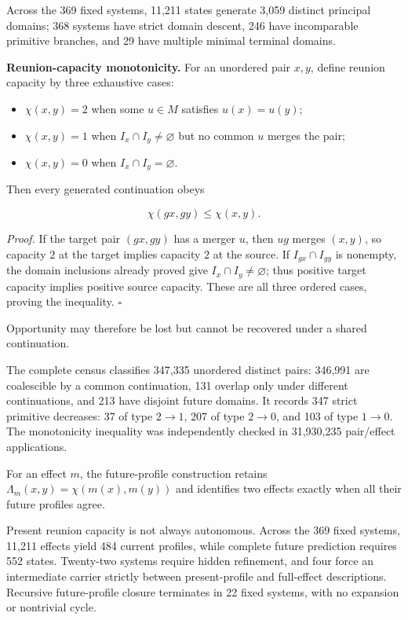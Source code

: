 \documentclass[11pt,a4paper]{article}
\begin{document}
Across the 369 fixed systems, 11,211 states generate 3,059 distinct
principal domains; 368 systems have strict domain descent, 246 have
incomparable primitive branches, and 29 have multiple minimal terminal
domains.

\textbf{Reunion-capacity monotonicity.} For an unordered pair \(x,y\),
define reunion capacity by three exhaustive cases:

\begin{itemize}
\tightlist
\item
  \(\chi(x,y) = 2\) when some \(u \in M\) satisfies \(u(x) = u(y)\);
\item
  \(\chi(x,y) = 1\) when \(I_{x} \cap I_{y} \neq \varnothing\) but no
  common \(u\) merges the pair;
\item
  \(\chi(x,y) = 0\) when \(I_{x} \cap I_{y} = \varnothing\).
\end{itemize}

Then every generated continuation obeys

\[\chi(gx,gy) \leq \chi(x,y).\]

\emph{Proof.} If the target pair \((gx,gy)\) has a merger \(u\), then
\(ug\) merges \((x,y)\), so capacity \(2\) at the target implies
capacity \(2\) at the source. If \(I_{gx} \cap I_{gy}\) is nonempty, the
domain inclusions already proved give
\(I_{x} \cap I_{y} \neq \varnothing\); thus positive target capacity
implies positive source capacity. These are all three ordered cases,
proving the inequality. \(\ensuremath{\square}\)

Opportunity may therefore be lost but cannot be recovered under a shared
continuation.

The complete census classifies 347,335 unordered distinct pairs: 346,991
are coalescible by a common continuation, 131 overlap only under
different continuations, and 213 have disjoint future domains. It
records 347 strict primitive decreases: 37 of type \(2 \rightarrow 1\),
207 of type \(2 \rightarrow 0\), and 103 of type \(1 \rightarrow 0\).
The monotonicity inequality was independently checked in 31,930,235
pair/effect applications.

For an effect \(m\), the future-profile construction retains
\(\Lambda_{m}(x,y) = \chi\left( m(x),m(y) \right)\) and identifies two
effects exactly when all their future profiles agree.

Present reunion capacity is not always autonomous. Across the 369 fixed
systems, 11,211 effects yield 484 current profiles, while complete
future prediction requires 552 states. Twenty-two systems require hidden
refinement, and four force an intermediate carrier strictly between
present-profile and full-effect descriptions. Recursive future-profile
closure terminates in 22 fixed systems, with no expansion or nontrivial
cycle.
\end{document}
